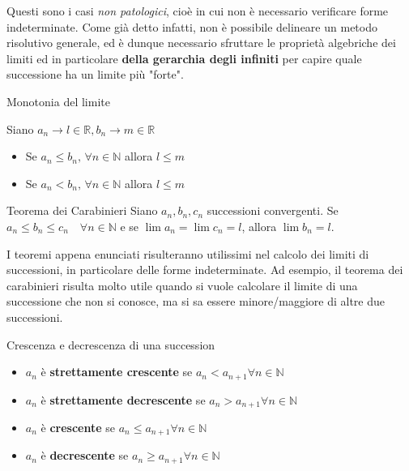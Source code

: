 \documentclass[12pt]{report}
\newcommand{\N}{\mathbb{N}}
\newcommand{\R}{\mathbb{R}}
\begin{document}
	Questi sono i casi \textit{non patologici}, cioè in cui non è necessario verificare forme indeterminate.
	\smallbreak
	Come già detto infatti, non è possibile delineare un metodo risolutivo generale, ed è dunque necessario sfruttare le proprietà algebriche dei limiti ed in particolare \textbf{della gerarchia degli infiniti} per capire quale successione ha un limite più "forte".
	
	\begin{teorema}{Monotonia del limite}{}
		
		Siano $a_n \to l \in \R, b_n \to m \in \R$
		\begin{itemize}
			
			\item Se $a_n \leq b_n,\, \forall n \in \N$ allora $l \leq m$
			
			\item Se $a_n < b_n,\, \forall n \in \N$ allora $l \leq m$
			
		\end{itemize}
		
	\end{teorema}
	
	\begin{teorema}{Teorema dei Carabinieri}{}
		Siano $a_n, b_n, c_n$ successioni convergenti.
		Se $a_n \le b_n \le c_n \quad \forall n \in \N$ e se $\lim a_n = \lim c_n = l$, allora $\lim b_n = l$.
	\end{teorema}
	
	I teoremi appena enunciati risulteranno utilissimi nel calcolo dei limiti di successioni, in particolare delle forme indeterminate. Ad esempio, il teorema dei carabinieri risulta molto utile quando si vuole calcolare il limite di una successione che non si conosce, ma si sa essere minore/maggiore di altre due successioni.
	
	\begin{definizione}{Crescenza e decrescenza di una succession}{}
		
		\begin{itemize}
			
			\item $a_n$ è \textbf{strettamente crescente} se $a_n < a_{n+1} \forall n \in \N$
			
			\item $a_n$ è \textbf{strettamente decrescente} se $a_n > a_{n+1} \forall n \in \N$
			
			\item $a_n$ è \textbf{crescente} se $a_n \leq a_{n+1} \forall n \in \N$
			
			\item $a_n$ è \textbf{decrescente} se $a_n \geq a_{n+1} \forall n \in \N$
			
		\end{itemize}
		
	\end{definizione}
	
\end{document}
